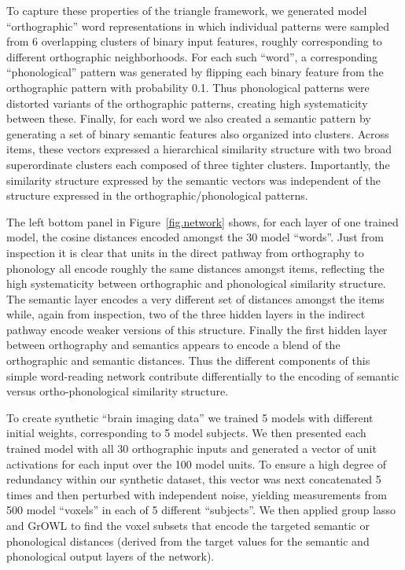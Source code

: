 To capture these properties of the triangle framework, we generated model ``orthographic''
word representations in which individual patterns were sampled from 6 overlapping clusters
of binary input features, roughly corresponding to different orthographic neighborhoods.
For each such ``word'', a corresponding ``phonological'' pattern was generated by flipping
each binary feature from the orthographic pattern with probability 0.1. Thus phonological
patterns were distorted variants of the orthographic patterns, creating high systematicity
between these. Finally, for each word we also created a semantic pattern by generating a
set of binary semantic features also organized into clusters. Across items, these vectors
expressed a hierarchical similarity structure with two broad superordinate clusters each
composed of three tighter clusters. Importantly, the similarity structure expressed by the
semantic vectors was independent of the structure expressed in the
orthographic/phonological patterns. 

The left bottom panel in Figure~\ref{fig.network} shows, for each layer of one trained
model, the cosine distances encoded amongst the 30 model ``words''. Just from inspection
it is clear that units in the direct pathway from orthography to phonology all encode
roughly the same distances amongst items, reflecting the high systematicity between
orthographic and phonological similarity structure. The semantic layer encodes a very
different set of distances amongst the items while, again from inspection, two of the
three hidden layers in the indirect pathway encode weaker versions of this structure.
Finally the first hidden layer between orthography and semantics appears to encode a blend
of the orthographic and semantic distances. Thus the different components of this simple
word-reading network contribute differentially to the encoding of semantic versus
ortho-phonological similarity structure. 

To create synthetic ``brain imaging data'' we trained 5 models with different initial
weights, corresponding to 5 model subjects. We then presented each trained model with all
30 orthographic inputs and generated a vector of unit activations for each input over the
100 model units. To ensure a high degree of redundancy within our synthetic dataset, this
vector was next concatenated 5 times and then perturbed with independent noise, yielding
measurements from 500 model ``voxels'' in each of 5 different ``subjects''. We then
applied group lasso and GrOWL to find the voxel subsets that encode the targeted semantic
or phonological distances (derived from the target values for the semantic and
phonological output layers of the network). 

